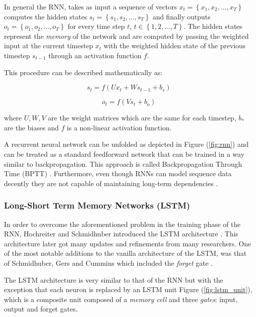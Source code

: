\documentclass[a4paper, 12pt]{article}
\numberwithin{equation}{section}
\numberwithin{figure}{section}
\numberwithin{table}{section}
\begin{document}
	In general the RNN, takes as input a sequence of vectors $x_t = \left \{ x_1, x_2, ..., x_T \right \}$ computes the hidden states $s_t = \left \{ s_1, s_2, ..., s_T\right \}$ and finally outputs $o_t = \left \{ o_1, o_2, ..., o_T\right\}$ for every time step $t$, $t \in \left \{1, 2, ..., T\right\}$. The hidden states represent the \textit{memory} of the network and are computed by passing the weighted input at the current timestep $x_t$ with the weighted hidden state of the previous timestep $s_{t-1}$ through an activation function $f$.\par
	
	\vspace*{0.5cm}
	
	\noindent This procedure can be described mathematically as:
	
	\begin{equation}
		s_{t} = f(Ux_{t} + Ws_{t-1} + b_s)
	\end{equation}
	
	\begin{equation}
		o_{t} = f(Vs_{t} + b_o)
	\end{equation}
	
	\vspace*{0.5cm}
	\noindent where $U, W, V$ are the weight matrices which are the same for each timestep, $b_{*}$ are the biases and $f$ is a non-linear activation function.\par
	
	A recurrent neural network can be unfolded as depicted in Figure (\ref{fig:rnn}) and can be treated as a standard feedforward network that can be trained in a way similar to backpropagation. This approach is called Backpropagation Through Time (BPTT) \cite{BPTT}. Furthermore, even though RNNs can model sequence data decently they are not capable of maintaining long-term dependencies \cite{rnn_learn_difficulties}.

	\subsubsection{Long-Short Term Memory Networks (LSTM)}
	
	In order to overcome the aforementioned problem in the training phase of the RNN, Hochreiter and Schmidhuber introduced the LSTM architecture \cite{LSTM}. This architecture later got many updates and refinements from many researchers. One of the most notable additions to the vanilla architecture of the LSTM, was that of Schmidhuber, Gers and Cummins which included the \textit{forget} gate \cite{LSTM_forget}.\par
	The LSTM architecture is very similar to that of the RNN but with the exception that each neuron is replaced by an LSTM unit \textemdash Figure (\ref{fig:lstm_unit}), which is a composite unit composed of a \textit{memory cell} and three \textit{gates}: input, output and forget gates.
	
\end{document}
